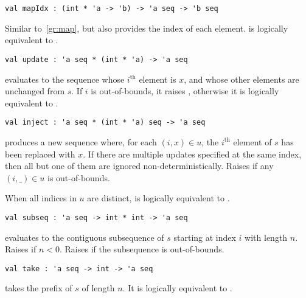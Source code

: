 \begin{gram}[mapIdx]
\label{gr:mapIdx}
\begin{verbatim}
val mapIdx : (int * 'a -> 'b) -> 'a seq -> 'b seq
\end{verbatim}
Similar to~\ref{gr:map}, but also provides the index of each element.
 is logically equivalent to .
\end{gram}

\begin{gram}[update]
\label{gr:update}
\begin{verbatim}
val update : 'a seq * (int * 'a) -> 'a seq
\end{verbatim}
 evaluates to the sequence whose $i^\text{th}$ element
is $x$, and whose other elements are unchanged from $s$. If $i$ is out-of-bounds,
it raises , otherwise it is logically equivalent to
.
\end{gram}

\begin{group}
\begin{gram}[inject]
\label{gr:inject}
\begin{verbatim}
val inject : 'a seq * (int * 'a) seq -> 'a seq
\end{verbatim}
 produces a new sequence where, for each $(i,x) \in u$,
the $i^\text{th}$ element of $s$ has been replaced with $x$. If there are
multiple updates specified
at the same index, then all but one of them are ignored non-deterministically.
Raises  if any $(i,\_) \in u$ is out-of-bounds.
\end{gram}
\begin{note}
When all indices in $u$ are distinct,  is logically
equivalent to .
\end{note}
\end{group}

\begin{gram}[subseq]
\label{gr:subseq}
\begin{verbatim}
val subseq : 'a seq -> int * int -> 'a seq
\end{verbatim}
 evaluates to the contiguous subsequence of $s$ starting
at index $i$ with length $n$. Raises  if $n < 0$. Raises 
if the subsequence is out-of-bounds.
\end{gram}

\begin{gram}[take]
\label{gr:take}
\begin{verbatim}
val take : 'a seq -> int -> 'a seq
\end{verbatim}
 takes the prefix of $s$ of length $n$. It is logically
equivalent to .
\end{gram}

